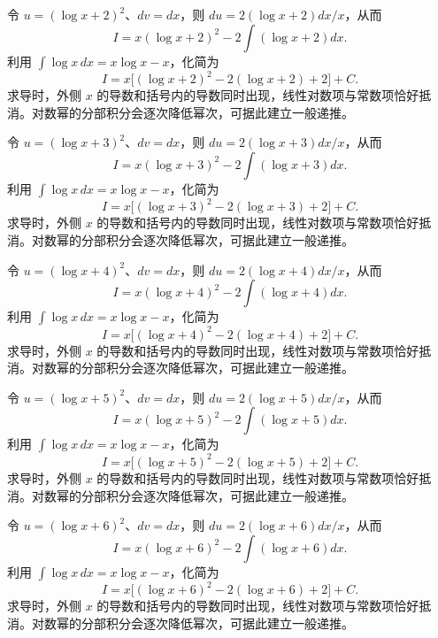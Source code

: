 \documentclass[12pt,fontset=fandol]{ctexart}
\begin{document}
\begin{solve}\label{ans:c15q14}
令 $u=(\log x+2)^2$、$dv=dx$，则 $du=2(\log x+2)dx/x$，从而
\[
I=x(\log x+2)^2-2\int(\log x+2)dx.
\]
利用 $\int\log x\,dx=x\log x-x$，化简为
\[
I=x\bigl[(\log x+2)^2-2(\log x+2)+2\bigr]+C.
\]
求导时，外侧 $x$ 的导数和括号内的导数同时出现，线性对数项与常数项恰好抵消。对数幂的分部积分会逐次降低幂次，可据此建立一般递推。
\end{solve}

\begin{solve}\label{ans:c15q15}
令 $u=(\log x+3)^2$、$dv=dx$，则 $du=2(\log x+3)dx/x$，从而
\[
I=x(\log x+3)^2-2\int(\log x+3)dx.
\]
利用 $\int\log x\,dx=x\log x-x$，化简为
\[
I=x\bigl[(\log x+3)^2-2(\log x+3)+2\bigr]+C.
\]
求导时，外侧 $x$ 的导数和括号内的导数同时出现，线性对数项与常数项恰好抵消。对数幂的分部积分会逐次降低幂次，可据此建立一般递推。
\end{solve}

\begin{solve}\label{ans:c15q16}
令 $u=(\log x+4)^2$、$dv=dx$，则 $du=2(\log x+4)dx/x$，从而
\[
I=x(\log x+4)^2-2\int(\log x+4)dx.
\]
利用 $\int\log x\,dx=x\log x-x$，化简为
\[
I=x\bigl[(\log x+4)^2-2(\log x+4)+2\bigr]+C.
\]
求导时，外侧 $x$ 的导数和括号内的导数同时出现，线性对数项与常数项恰好抵消。对数幂的分部积分会逐次降低幂次，可据此建立一般递推。
\end{solve}

\begin{solve}\label{ans:c15q17}
令 $u=(\log x+5)^2$、$dv=dx$，则 $du=2(\log x+5)dx/x$，从而
\[
I=x(\log x+5)^2-2\int(\log x+5)dx.
\]
利用 $\int\log x\,dx=x\log x-x$，化简为
\[
I=x\bigl[(\log x+5)^2-2(\log x+5)+2\bigr]+C.
\]
求导时，外侧 $x$ 的导数和括号内的导数同时出现，线性对数项与常数项恰好抵消。对数幂的分部积分会逐次降低幂次，可据此建立一般递推。
\end{solve}

\begin{solve}\label{ans:c15q18}
令 $u=(\log x+6)^2$、$dv=dx$，则 $du=2(\log x+6)dx/x$，从而
\[
I=x(\log x+6)^2-2\int(\log x+6)dx.
\]
利用 $\int\log x\,dx=x\log x-x$，化简为
\[
I=x\bigl[(\log x+6)^2-2(\log x+6)+2\bigr]+C.
\]
求导时，外侧 $x$ 的导数和括号内的导数同时出现，线性对数项与常数项恰好抵消。对数幂的分部积分会逐次降低幂次，可据此建立一般递推。
\end{solve}
\end{document}
